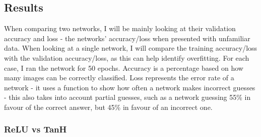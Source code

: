 \documentclass[a4paper, 11pt]{article}
\begin{document}
\subsection*{Results}
When comparing two networks, I will be mainly looking at their validation accuracy and loss - the networks' accuracy/loss when presented with unfamiliar data. When looking at a single network, I will compare the training accuracy/loss with the validation accuracy/loss, as this can help identify overfitting.
For each case, I ran the network for 50 epochs. Accuracy is a percentage based on how many images can be correctly classified. Loss represents the error rate of a network - it uses a function to show how often a network makes incorrect guesses - this also takes into account partial guesses, such as a network guessing 55\% in favour of the correct answer, but 45\% in favour of an incorrect one. 

\subsubsection*{ReLU vs TanH}
\end{document}
